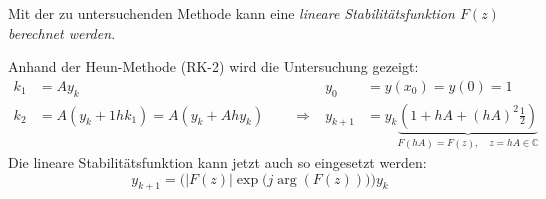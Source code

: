       Mit der zu untersuchenden Methode kann eine \em lineare Stabilitätsfunktion \em $F(z)$
      berechnet werden.

       Anhand der Heun-Methode (RK-2) wird die Untersuchung gezeigt:
      \begin{align*}
        k_1 &= A y_k                                          & y_0 &= y(x_0) = y(0) = 1\\
        k_2 &= A(y_k + 1 h k_1) = A(y_k + Ah y_k) \qquad \Longrightarrow &
        y_{k+1} &= y_k \underbrace{\left(1 + hA + (hA)^2 \frac12\right)}_{F(hA) = F(z), \quad z=hA \in \mathbb{C}}
      \end{align*}
      Die lineare Stabilitätsfunktion kann jetzt auch so eingesetzt werden:
      $$y_{k+1} = \Big( | F(z) | \exp \big(j \arg(F(z))\big) \Big) y_k$$

